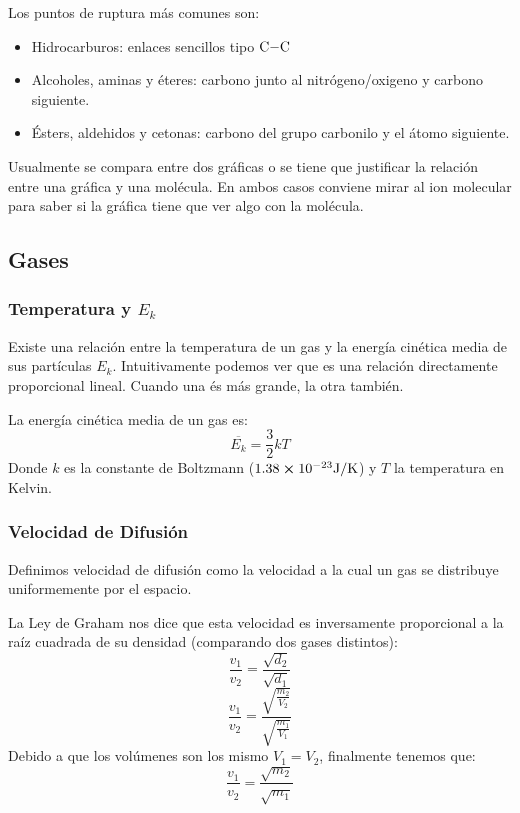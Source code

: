\documentclass[arial,a4paper,print]{article}
\begin{document}
Los puntos de ruptura más comunes son:
\begin{itemize}
\item Hidrocarburos: enlaces sencillos tipo $\ce{C-C}$
\item Alcoholes, aminas y éteres: carbono junto al nitrógeno/oxigeno y carbono siguiente.
\item Ésters, aldehidos y cetonas: carbono del grupo carbonilo y el átomo siguiente.
\end{itemize}

Usualmente se compara entre dos gráficas o se tiene que justificar la relación entre una gráfica y una molécula. En ambos casos conviene mirar al ion molecular para saber si la gráfica tiene que ver algo con la molécula. 

\subsection{Gases}

\subsubsection{Temperatura y $E_{k}$}
Existe una relación entre la temperatura de un gas y la energía cinética media de sus partículas $E_{k}$. Intuitivamente podemos ver que es una relación directamente proporcional lineal. Cuando una és más grande, la otra también. 

La energía cinética media de un gas es:
\begin{equation*}
	\overline{E_{k}} = \frac32 kT
\end{equation*}
Donde $k$ es la constante de Boltzmann ($1.38\cross10^{-23}\si{J/K}$) y $T$ la temperatura en Kelvin. 

\subsubsection{Velocidad de Difusión}
Definimos velocidad de difusión como la velocidad a la cual un gas se distribuye uniformemente por el espacio. 

La Ley de Graham nos dice que esta velocidad es inversamente proporcional a la raíz cuadrada de su densidad (comparando dos gases distintos):
\begin{equation*}
	\frac{v_{1}}{v_{2}} = \frac{\sqrt{d_{2}}}{\sqrt{d_{1}}}
\end{equation*}
\begin{equation*}
	\frac{v_{1}}{v_{2}} = \frac{\sqrt{\frac{m_{2}}{V_{2}}}}{\sqrt{\frac{m_{1}}{V_{1}}}}
\end{equation*}
Debido a que los volúmenes son los mismo $V_{1} = V_{2}$, finalmente tenemos que:
\begin{equation*}
	\frac{v_{1}}{v_{2}} = \frac{\sqrt{m_{2}}}{\sqrt{m_{1}}}
\end{equation*}
\end{document}
